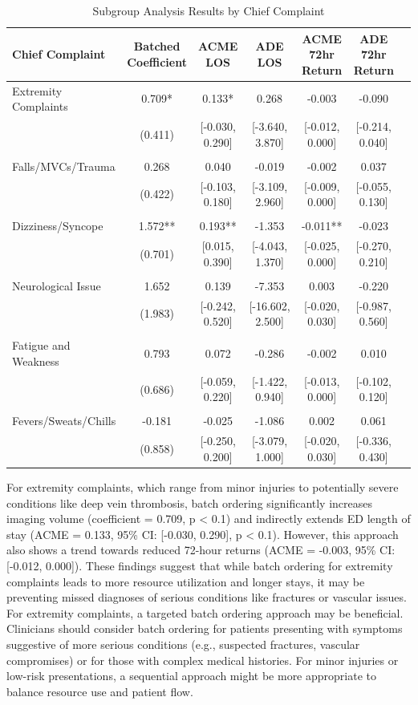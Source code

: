 \documentclass[,,nonblindrev]{informs}
\begin{document}
\begin{table}[!htbp]
\centering
\caption{Subgroup Analysis Results by Chief Complaint}
\label{tab:subgroup_analysis}
\tiny
\begin{tabularx}{\textwidth}{Xcccccc}
\toprule
Chief Complaint & Batched Coefficient & ACME LOS & ADE LOS & ACME 72hr Return & ADE 72hr Return \\
\midrule
Extremity Complaints & 0.709* & 0.133* & 0.268 & -0.003 & -0.090 \\
 & (0.411) & [-0.030, 0.290] & [-3.640, 3.870] & [-0.012, 0.000] & [-0.214, 0.040] \\
 \\
Falls/MVCs/Trauma & 0.268 & 0.040 & -0.019 & -0.002 & 0.037 \\
 & (0.422) & [-0.103, 0.180] & [-3.109, 2.960] & [-0.009, 0.000] & [-0.055, 0.130] \\
 \\
Dizziness/Syncope & 1.572** & 0.193** & -1.353 & -0.011** & -0.023 \\
 & (0.701) & [0.015, 0.390] & [-4.043, 1.370] & [-0.025, 0.000] & [-0.270, 0.210] \\
 \\
Neurological Issue & 1.652 & 0.139 & -7.353 & 0.003 & -0.220 \\
 & (1.983) & [-0.242, 0.520] & [-16.602, 2.500] & [-0.020, 0.030] & [-0.987, 0.560] \\
 \\
Fatigue and Weakness & 0.793 & 0.072 & -0.286 & -0.002 & 0.010 \\
 & (0.686) & [-0.059, 0.220] & [-1.422, 0.940] & [-0.013, 0.000] & [-0.102, 0.120] \\
 \\
Fevers/Sweats/Chills & -0.181 & -0.025 & -1.086 & 0.002 & 0.061 \\
 & (0.858) & [-0.250, 0.200] & [-3.079, 1.000] & [-0.020, 0.030] & [-0.336, 0.430] \\
\bottomrule
\end{tabularx}
\end{table}

For extremity complaints, which range from minor injuries to potentially
severe conditions like deep vein thrombosis, batch ordering
significantly increases imaging volume (coefficient = 0.709, p
\textless{} 0.1) and indirectly extends ED length of stay (ACME = 0.133,
95\% CI: {[}-0.030, 0.290{]}, p \textless{} 0.1). However, this approach
also shows a trend towards reduced 72-hour returns (ACME = -0.003, 95\%
CI: {[}-0.012, 0.000{]}). These findings suggest that while batch
ordering for extremity complaints leads to more resource utilization and
longer stays, it may be preventing missed diagnoses of serious
conditions like fractures or vascular issues. For extremity complaints,
a targeted batch ordering approach may be beneficial. Clinicians should
consider batch ordering for patients presenting with symptoms suggestive
of more serious conditions (e.g., suspected fractures, vascular
compromises) or for those with complex medical histories. For minor
injuries or low-risk presentations, a sequential approach might be more
appropriate to balance resource use and patient flow.
\end{document}

